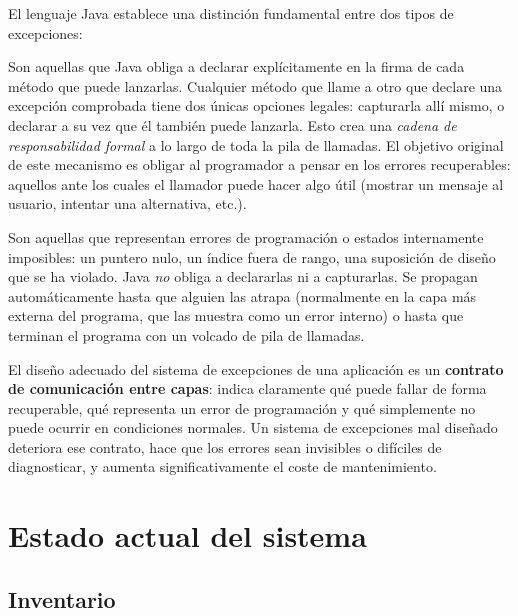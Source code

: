 \documentclass[11pt,a4paper]{article}
\begin{document}
El lenguaje Java establece una distinción fundamental entre dos tipos de excepciones:

\begin{description}[leftmargin=2em]
    \item[\textbf{Excepciones comprobadas} (\textit{checked})]
        Son aquellas que Java obliga a declarar explícitamente en la firma de cada método que
        puede lanzarlas. Cualquier método que llame a otro que declare una excepción comprobada
        tiene dos únicas opciones legales: capturarla allí mismo, o declarar a su vez que él
        también puede lanzarla. Esto crea una \emph{cadena de responsabilidad formal} a lo largo
        de toda la pila de llamadas. El objetivo original de este mecanismo es obligar al
        programador a pensar en los errores recuperables: aquellos ante los cuales el llamador
        puede hacer algo útil (mostrar un mensaje al usuario, intentar una alternativa, etc.).

    \item[\textbf{Excepciones no comprobadas} (\textit{unchecked})]
        Son aquellas que representan errores de programación o estados internamente imposibles:
        un puntero nulo, un índice fuera de rango, una suposición de diseño que se ha violado.
        Java \emph{no} obliga a declararlas ni a capturarlas. Se propagan automáticamente hasta
        que alguien las atrapa (normalmente en la capa más externa del programa, que las muestra
        como un error interno) o hasta que terminan el programa con un volcado de pila de llamadas.
\end{description}

El diseño adecuado del sistema de excepciones de una aplicación es un \textbf{contrato de
comunicación entre capas}: indica claramente qué puede fallar de forma recuperable, qué representa
un error de programación y qué simplemente no puede ocurrir en condiciones normales. Un sistema
de excepciones mal diseñado deteriora ese contrato, hace que los errores sean invisibles o
difíciles de diagnosticar, y aumenta significativamente el coste de mantenimiento.

\section{Estado actual del sistema}

\subsection{Inventario}
\end{document}
